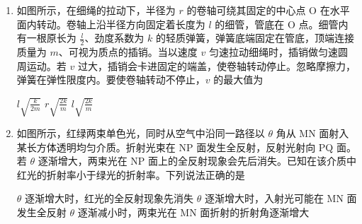 \documentclass[\gkver]{gaokaozhenti}
\begin{document}
\begin{enumerate}
{D．永磁铁相对线圈下降时，根据楞次定律可知线圈中感应电流的方向为顺时针方向，故 D 正确。

故选 D。
}

\item
如图所示，在细绳的拉动下，半径为 $r$ 的卷轴可绕其固定的中心点 O 在水平面内转动。卷轴上沿半径方向固定着长度为 $l$ 的细管，管底在 O 点。细管内有一根原长为 $\frac{l}{2}$、劲度系数为 $k$ 的轻质弹簧，弹簧底端固定在管底，顶端连接质量为 $m$、可视为质点的插销。当以速度 $v$ 匀速拉动细绳时，插销做匀速圆周运动。若 $v$ 过大，插销会卡进固定的端盖，使卷轴转动停止。忽略摩擦力，弹簧在弹性限度内。要使卷轴转动不停止，$v$ 的最大值为


{$l\sqrt{\frac{k}{2m}}$}
{$r\sqrt{\frac{2k}{m}}$}
{$l\sqrt{\frac{2k}{m}}$}


\item
如图所示，红绿两束单色光，同时从空气中沿同一路径以 $\theta$ 角从 MN 面射入某长方体透明均匀介质。折射光束在 NP 面发生全反射，反射光射向 PQ 面。若 $\theta$ 逐渐增大，两束光在 NP 面上的全反射现象会先后消失。已知在该介质中红光的折射率小于绿光的折射率。下列说法正确的是


{$\theta$ 逐渐增大时，红光的全反射现象先消失}
{$\theta$ 逐渐增大时，入射光可能在 MN 面发生全反射}
{$\theta$ 逐渐减小时，两束光在 MN 面折射的折射角逐渐增大}

\end{enumerate}
\end{document}
